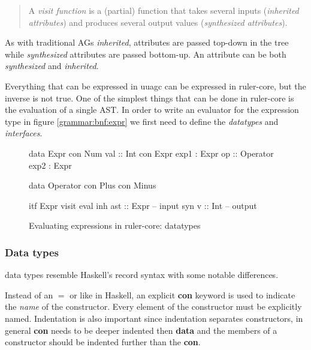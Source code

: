\begin{quotation}
A \emph{visit function}\cite{visitag} is a (partial) function that takes several inputs (\emph{inherited attributes}) and produces several output values (\emph{synthesized attributes}).
\end{quotation}

As with traditional AGs \emph{inherited}, attributes are passed top-down in the tree while \emph{synthesized} attributes are passed bottom-up. An attribute can be both \emph{synthesized} and \emph{inherited}.

Everything that can be expressed in uuagc can be expressed in ruler-core, but the inverse is not true. One of the simplest things that can be done in ruler-core is the evaluation of a single AST. In order to write an evaluator for the expression type in figure \ref{grammar:bnf:expr} we first need to define the \emph{datatypes} and \emph{interfaces}.

\begin{figure}[H]
\begin{minipage}[t]{0.4\linewidth}
\begin{code}
data Expr
  con Num
    val     :: Int
  con Expr
    exp1    :  Expr
    op      :: Operator
    exp2    :  Expr
\end{code}
\end{minipage}
\begin{minipage}[t]{0.6\linewidth}
\begin{code}
data Operator
  con Plus
  con Minus

itf Expr
  visit eval
    inh ast  :: Expr -- input
    syn v    :: Int  -- output
\end{code}
\end{minipage}
\caption{Evaluating expressions in ruler-core: datatypes}
\label{example:tutorial1:datatypes}
\end{figure}

\subsubsection{Data types}
\Rcore data types resemble Haskell's record syntax with some notable differences.

Instead of an $=$ or \textbar \space like in Haskell, an explicit \textbf{con} keyword is used to indicate the \emph{name} of the constructor. Every element of the constructor must be explicitly named. Indentation is also important since indentation separates constructors, in general \textbf{con} needs to be deeper indented then \textbf{data} and the members of a constructor should be indented further than the \textbf{con}. 

